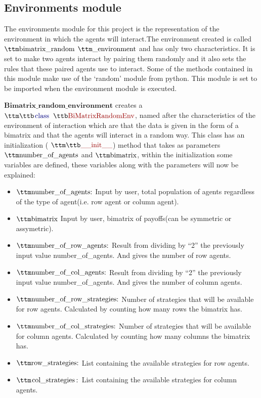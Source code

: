 \subsection{Environments module}
The environments module for this project is the representation of the environment in which the agents will interact.The environment created is called $\pythoninline{bimatrix\_random}$ $\pythoninline{\_environment}$ and has only two characteristics. It is set to make two agents interact by pairing them randomly and it also sets the rules that these paired agents use to interact. Some of the methods contained in this module make use of the ‘random’ module from python. This module is set to be imported when the environment module is executed. 

$\textbf{Bimatrix\_random\_environment}$ creates a $\pythoninline{class BiMatrixRandomEnv}$, named after the characteristics of the environment of interaction which are that the data is given in the form of a bimatrix and that the agents will interact in a random way. This class has an initialization ( $\pythoninline{\_\_init\_\_}$) method that takes as parameters $\pythoninline{number\_of\_agents}$ and $\pythoninline{bimatrix}$, within the initialization some variables are defined, these variables along with the parameters will now be explained:

\begin{itemize}
\item $\pythoninline{ number\_of\_agents:}$ Input by user, total population of agents regardless of the type of agent(i.e. row agent or column agent).
\item $\pythoninline{bimatrix}$ Input by user, bimatrix of payoffs(can be symmetric or assymetric).
\item $\pythoninline{number\_of\_row\_agents:}$ Result from dividing by “2” the previously input value number\_of\_agents. And gives the number of row agents.
\item $\pythoninline{number\_of\_col\_agents:}$ Result from dividing by “2” the previously input value number\_of\_agents. And gives the number of column agents.
\item $\pythoninline{number\_of\_row\_strategies:}$ Number of strategies that will be available for row agents. Calculated by counting how many rows the bimatrix has.
\item $\pythoninline{number\_of\_col\_strategies:}$ Number of strategies that will be available for column agents. Calculated by counting how many columns the bimatrix has.
\item $\pythoninline{row\_strategies:}$ List containing the available strategies for row agents.
\item $\pythoninline{col\_strategies:}$ List containing the available strategies for column agents.
\end{itemize}

